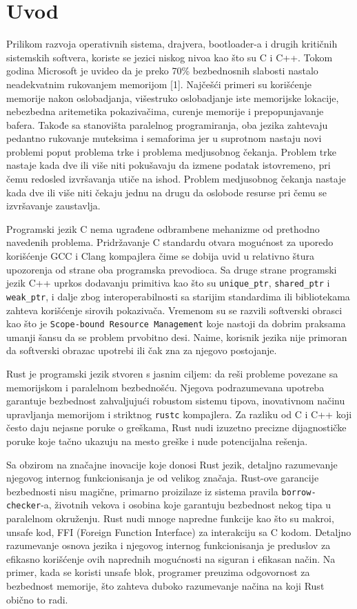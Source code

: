 \section{Uvod}

Prilikom razvoja operativnih sistema, drajvera, bootloader-a i drugih kritičnih sistemskih softvera, koriste se jezici niskog nivoa kao što su C i C++.
Tokom godina Microsoft je uvideo da je preko 70\% bezbednosnih slabosti nastalo neadekvatnim rukovanjem memorijom [1]. Najčešći primeri su korišćenje memorije 
nakon oslobadjanja, višestruko oslobadjanje iste memorijske lokacije, nebezbedna aritemetika pokazivačima, curenje memorije i prepopunjavanje bafera.
Takođe sa stanovišta paralelnog programiranja, oba jezika zahtevaju pedantno rukovanje muteksima i semaforima jer u suprotnom nastaju novi problemi poput 
problema trke i problema medjusobnog čekanja. Problem trke nastaje kada dve ili više niti pokušavaju da izmene podatak istovremeno, pri čemu redosled izvršavanja 
utiče na ishod. Problem medjusobnog čekanja nastaje kada dve ili više niti čekaju jednu na drugu da oslobode resurse pri čemu se izvršavanje 
zaustavlja.

Programski jezik C nema ugrađene odbrambene mehanizme od prethodno navedenih problema. Pridržavanje C standardu otvara mogućnost za uporedo 
korišćenje GCC i Clang kompajlera čime se dobija uvid u relativno štura upozorenja od strane oba programska prevodioca.
Sa druge strane programski jezik C++ uprkos dodavanju primitiva kao što su \verb|unique_ptr|, \verb|shared_ptr| i \verb|weak_ptr|, i dalje zbog interoperabilnosti 
sa starijim standardima ili bibliotekama zahteva korišćenje sirovih pokazivača. Vremenom su se razvili softverski obrasci kao što je \verb|Scope-bound Resource Management|
koje nastoji da dobrim praksama umanji šansu da se problem prvobitno desi. Naime, korisnik jezika nije primoran da softverski obrazac upotrebi ili čak zna 
za njegovo postojanje.

Rust je programski jezik stvoren s jasnim ciljem: da reši probleme povezane sa memorijskom i paralelnom bezbednošću. 
Njegova podrazumevana upotreba garantuje bezbednost zahvaljujući robustom sistemu tipova, inovativnom načinu upravljanja memorijom i striktnog \verb|rustc| kompajlera.
Za razliku od C i C++ koji često daju nejasne poruke o greškama, Rust nudi izuzetno precizne dijagnostičke poruke koje tačno ukazuju na mesto 
greške i nude potencijalna rešenja.

Sa obzirom na značajne inovacije koje donosi Rust jezik, detaljno razumevanje njegovog internog funkcionisanja je od velikog značaja. Rust-ove garancije 
bezbednosti nisu magične, primarno proizilaze iz sistema pravila \verb|borrow-checker|-a, životnih vekova i osobina koje garantuju bezbednost nekog tipa 
u paralelnom okruženju. Rust nudi mnoge napredne funkcije kao što su makroi, unsafe kod, FFI (Foreign Function Interface) za interakciju sa C kodom. Detaljno razumevanje osnova jezika i njegovog internog funkcionisanja je preduslov za efikasno korišćenje ovih naprednih 
mogućnosti na siguran i efikasan način. Na primer, kada se koristi unsafe blok, programer preuzima odgovornost za bezbednost memorije, 
što zahteva duboko razumevanje načina na koji Rust obično to radi.

